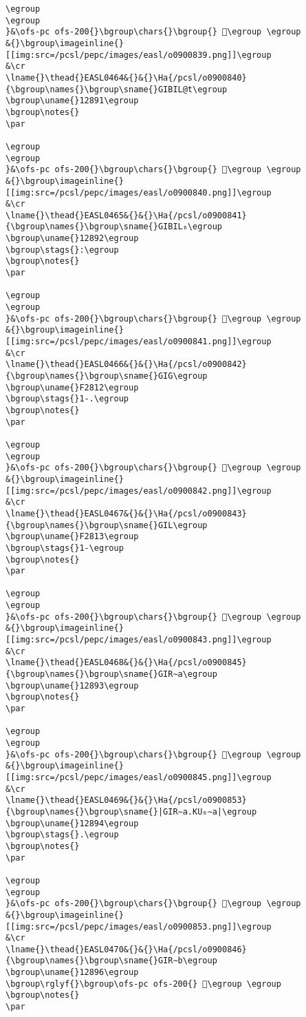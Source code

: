 \begin{verbatim}
\egroup
\egroup
}&\ofs-pc ofs-200{}\bgroup\chars{}\bgroup{} 𒢐\egroup \egroup
&{}\bgroup\imageinline{}[[img:src=/pcsl/pepc/images/easl/o0900839.png]]\egroup
&\cr
\lname{}\thead{}EASL0464&{}&{}\Ha{/pcsl/o0900840}{\bgroup\names{}\bgroup\sname{}GIBIL@t\egroup
\bgroup\uname{}12891\egroup
\bgroup\notes{}
\par 

\egroup
\egroup
}&\ofs-pc ofs-200{}\bgroup\chars{}\bgroup{} 𒢑\egroup \egroup
&{}\bgroup\imageinline{}[[img:src=/pcsl/pepc/images/easl/o0900840.png]]\egroup
&\cr
\lname{}\thead{}EASL0465&{}&{}\Ha{/pcsl/o0900841}{\bgroup\names{}\bgroup\sname{}GIBIL₆\egroup
\bgroup\uname{}12892\egroup
\bgroup\stags{}:\egroup
\bgroup\notes{}
\par 

\egroup
\egroup
}&\ofs-pc ofs-200{}\bgroup\chars{}\bgroup{} 𒢒\egroup \egroup
&{}\bgroup\imageinline{}[[img:src=/pcsl/pepc/images/easl/o0900841.png]]\egroup
&\cr
\lname{}\thead{}EASL0466&{}&{}\Ha{/pcsl/o0900842}{\bgroup\names{}\bgroup\sname{}GIG\egroup
\bgroup\uname{}F2812\egroup
\bgroup\stags{}1-.\egroup
\bgroup\notes{}
\par 

\egroup
\egroup
}&\ofs-pc ofs-200{}\bgroup\chars{}\bgroup{} 󲠒\egroup \egroup
&{}\bgroup\imageinline{}[[img:src=/pcsl/pepc/images/easl/o0900842.png]]\egroup
&\cr
\lname{}\thead{}EASL0467&{}&{}\Ha{/pcsl/o0900843}{\bgroup\names{}\bgroup\sname{}GIL\egroup
\bgroup\uname{}F2813\egroup
\bgroup\stags{}1-\egroup
\bgroup\notes{}
\par 

\egroup
\egroup
}&\ofs-pc ofs-200{}\bgroup\chars{}\bgroup{} 󲠓\egroup \egroup
&{}\bgroup\imageinline{}[[img:src=/pcsl/pepc/images/easl/o0900843.png]]\egroup
&\cr
\lname{}\thead{}EASL0468&{}&{}\Ha{/pcsl/o0900845}{\bgroup\names{}\bgroup\sname{}GIR∼a\egroup
\bgroup\uname{}12893\egroup
\bgroup\notes{}
\par 

\egroup
\egroup
}&\ofs-pc ofs-200{}\bgroup\chars{}\bgroup{} 𒢓\egroup \egroup
&{}\bgroup\imageinline{}[[img:src=/pcsl/pepc/images/easl/o0900845.png]]\egroup
&\cr
\lname{}\thead{}EASL0469&{}&{}\Ha{/pcsl/o0900853}{\bgroup\names{}\bgroup\sname{}|GIR∼a.KU₆∼a|\egroup
\bgroup\uname{}12894\egroup
\bgroup\stags{}.\egroup
\bgroup\notes{}
\par 

\egroup
\egroup
}&\ofs-pc ofs-200{}\bgroup\chars{}\bgroup{} 𒢔\egroup \egroup
&{}\bgroup\imageinline{}[[img:src=/pcsl/pepc/images/easl/o0900853.png]]\egroup
&\cr
\lname{}\thead{}EASL0470&{}&{}\Ha{/pcsl/o0900846}{\bgroup\names{}\bgroup\sname{}GIR∼b\egroup
\bgroup\uname{}12896\egroup
\bgroup\rglyf{}\bgroup\ofs-pc ofs-200{} 𒢖\egroup \egroup
\bgroup\notes{}
\par 


\end{verbatim}
